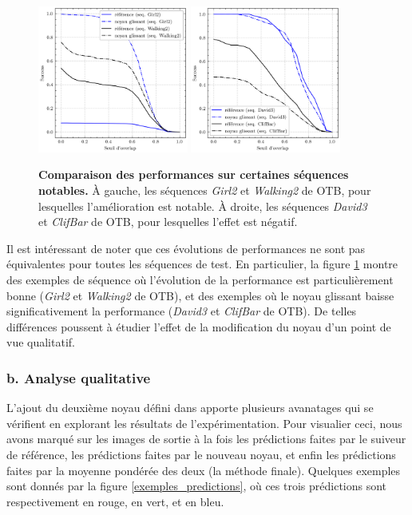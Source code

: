 \documentclass[10pt,twocolumn,letterpaper,french]{article}
\begin{document}
  \begin{figure}[!h]
  \centering
  \includegraphics[width=140pt]{images/gamma/courbes_succ_mutli.png} 
  \includegraphics[width=140pt]{images/gamma/courbes_succ_mutli_bof.png} 
  \caption{\textbf{Comparaison des performances sur certaines séquences notables.} À gauche, les séquences \textit{Girl2} et \textit{Walking2} de OTB, pour lesquelles l'amélioration est notable. À droite, les séquences \textit{David3} et \textit{ClifBar} de OTB, pour lesquelles l'effet est négatif.}
  \label{courbes_prec3}
  \end{figure}
 

Il est intéressant de noter que ces évolutions de performances ne sont pas équivalentes pour toutes les séquences de test. En particulier, la figure  \ref{courbes_prec3} montre des exemples de séquence où l'évolution de la performance est particulièrement bonne (\textit{Girl2} et \textit{Walking2} de OTB), et des exemples où le noyau glissant baisse significativement la performance  (\textit{David3} et \textit{ClifBar} de OTB). De telles différences poussent à étudier l'effet de la modification du noyau d'un point de vue qualitatif.
  




\subsubsection*{b. Analyse qualitative}


L'ajout du deuxième noyau défini dans \textit{} apporte plusieurs avanatages qui se vérifient en explorant les résultats de l'expérimentation. Pour visualier ceci, nous avons marqué sur les images de sortie à la fois les prédictions faites par le suiveur de référence, les prédictions faites par le nouveau noyau, et enfin les prédictions faites par la moyenne pondérée des deux (la méthode finale). Quelques exemples sont donnés par la figure \ref{exemples_predictions}, où ces trois prédictions sont respectivement en rouge, en vert, et en bleu.
\end{document}
